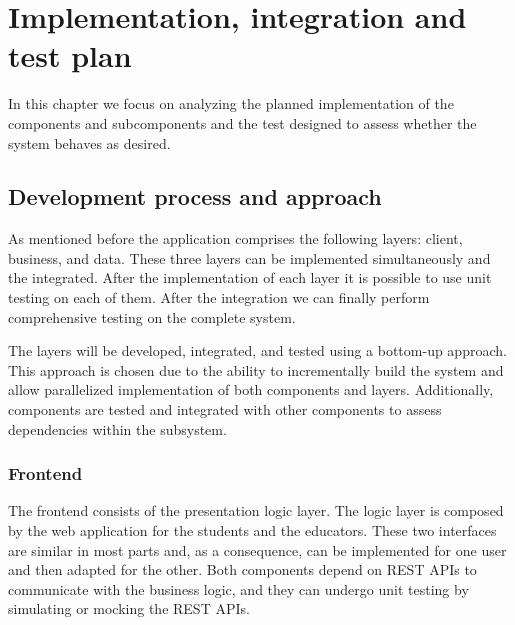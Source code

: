 \documentclass[12pt, a4paper]{report}
\begin{document}
\chapter{Implementation, integration and test plan}
    In this chapter we focus on analyzing the planned implementation of the components and subcomponents and the test designed to assess whether the system behaves as desired.

    \section{Development process and approach}
    As mentioned before the application comprises the following layers: client, business, and data. 
    These three layers can be implemented simultaneously and the integrated. 
    After the implementation of each layer it is possible to use unit testing on each of them. 
    After the integration we can finally perform comprehensive testing on the complete system. 

    The layers will be developed, integrated, and tested using a bottom-up approach. 
    This approach is chosen due to the ability to incrementally build the system and allow parallelized implementation of both components and layers. 
    Additionally, components are tested and integrated with other components to assess dependencies within the subsystem.

    \subsection{Frontend}
    The frontend consists of the presentation logic layer. 
    The logic layer is composed by the web application for the students and the educators. 
    These two interfaces are similar in most parts and, as a consequence, can be implemented for one user and then adapted for the other. 
    Both components depend on REST APIs to communicate with the business logic, and they can undergo unit testing by simulating or mocking the REST APIs.
\end{document}
